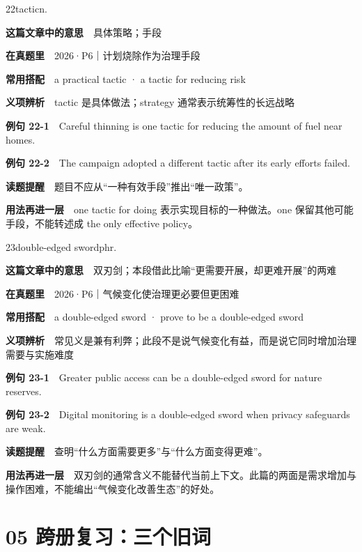 \documentclass[a4paper,11pt,openany]{report}
\newcommand{\emphasislabel}[1]{\textcolor{leaf}{\CJKsf\bfseries #1}}
\begin{document}
\begin{vocabbox}{22}{tactic}{n.}

\textbf{这篇文章中的意思}　具体策略；手段

\textbf{在真题里}　2026·P6｜计划烧除作为治理手段

\textbf{常用搭配}　a practical tactic · a tactic for reducing risk

\textbf{义项辨析}　tactic 是具体做法；strategy 通常表示统筹性的长远战略

\textbf{例句 22-1}　Careful thinning is one tactic for reducing the amount of fuel near homes.

\textbf{例句 22-2}　The campaign adopted a different tactic after its early efforts failed.

\emphasislabel{读题提醒}　题目不应从``一种有效手段''推出``唯一政策''。

\textbf{用法再进一层}　one tactic for doing 表示实现目标的一种做法。one 保留其他可能手段，不能转述成 the only effective policy。

\end{vocabbox}

\begin{vocabbox}{23}{double-edged sword}{phr.}

\textbf{这篇文章中的意思}　双刃剑；本段借此比喻``更需要开展，却更难开展''的两难

\textbf{在真题里}　2026·P6｜气候变化使治理更必要但更困难

\textbf{常用搭配}　a double-edged sword · prove to be a double-edged sword

\textbf{义项辨析}　常见义是兼有利弊；此段不是说气候变化有益，而是说它同时增加治理需要与实施难度

\textbf{例句 23-1}　Greater public access can be a double-edged sword for nature reserves.

\textbf{例句 23-2}　Digital monitoring is a double-edged sword when privacy safeguards are weak.

\emphasislabel{读题提醒}　查明``什么方面需要更多''与``什么方面变得更难''。

\textbf{用法再进一层}　双刃剑的通常含义不能替代当前上下文。此篇的两面是需求增加与操作困难，不能编出``气候变化改善生态''的好处。

\end{vocabbox}

\section{05 跨册复习：三个旧词}\label{ux8de8ux518cux590dux4e60ux4e09ux4e2aux65e7ux8bcd}
\end{document}
